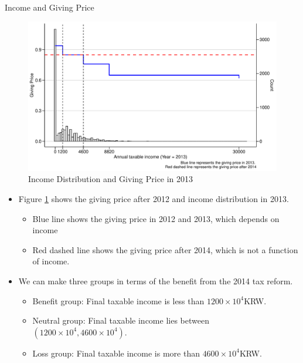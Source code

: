 \documentclass[
  ignorenonframetext,
]{beamer}
\providecommand{\tightlist}{%
  \setlength{\itemsep}{0pt}\setlength{\parskip}{0pt}}
\begin{document}
\begin{frame}{Income and Giving Price}
\protect\hypertarget{income-and-giving-price}{}
\begin{figure}[t]

{\centering \includegraphics[width=0.9\linewidth]{slides_files/figure-beamer/SummaryPriceChange-1} 

}

\caption{Income Distribution and Giving Price in 2013}\label{fig:SummaryPriceChange}
\end{figure}

\begin{itemize}
\tightlist
\item
  Figure \ref{fig:SummaryPriceChange} shows the giving price after 2012 and income distribution in 2013.

  \begin{itemize}
  \tightlist
  \item
    Blue line shows the giving price in 2012 and 2013, which depends on income
  \item
    Red dashed line shows the giving price after 2014, which is not a function of income.
  \end{itemize}
\item
  We can make three groups in terms of the benefit from the 2014 tax reform.

  \begin{itemize}
  \tightlist
  \item
    Benefit group: Final taxable income is less than \(1200 \times 10^4\)KRW.
  \item
    Neutral group: Final taxable income lies between \((1200 \times 10^4, 4600 \times 10^4)\).
  \item
    Loss group: Final taxable income is more than \(4600 \times 10^4\)KRW.
  \end{itemize}
\end{itemize}
\end{frame}
\end{document}
